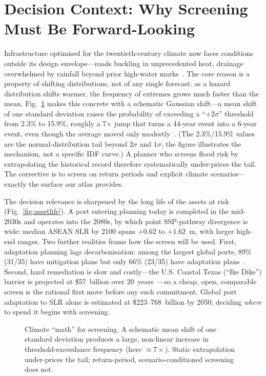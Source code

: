 \documentclass[conference]{IEEEtran}
\begin{document}
\section{Decision Context: Why Screening Must Be Forward-Looking}
Infrastructure optimised for the twentieth-century climate now faces conditions outside its design envelope---roads buckling in unprecedented heat, drainage overwhelmed by rainfall beyond prior high-water marks~\cite{jpm_intuition}. The core reason is a property of shifting distributions, not of any single forecast: as a hazard distribution shifts warmer, the frequency of extremes grows much faster than the mean. Fig.~\ref{fig:distshift} makes this concrete with a schematic Gaussian shift---a mean shift of one standard deviation raises the probability of exceeding a ``$+2\sigma$'' threshold from 2.3\% to 15.9\%, roughly a 7$\times$ jump that turns a 44-year event into a 6-year event, even though the average moved only modestly~\cite{patel2024}. (The 2.3\%/15.9\% values are the normal-distribution tail beyond $2\sigma$ and $1\sigma$; the figure illustrates the mechanism, not a specific IDF curve.) A planner who screens flood risk by extrapolating the historical record therefore systematically under-prices the tail. The corrective is to screen on return periods and explicit climate scenarios---exactly the surface our atlas provides.

The decision relevance is sharpened by the long life of the assets at risk (Fig.~\ref{fig:assetlife}). A port entering planning today is completed in the mid-2030s and operates into the 2080s, by which point SSP-pathway divergence is wide: median ASEAN SLR by 2100 spans $+0.62$ to $+1.62$~m, with larger high-end ranges. Two further realities frame how the screen will be used. First, adaptation planning lags decarbonisation: among the largest global ports, 89\% (31/35) have mitigation plans but only 66\% (23/35) have adaptation plans~\cite{jpm_seachange}. Second, hard remediation is slow and costly---the U.S. Coastal Texas (``Ike Dike'') barrier is projected at \$57~billion over 20~years~\cite{jpm_seachange}---so a cheap, open, comparable screen is the rational first move before any such commitment. Global port adaptation to SLR alone is estimated at \$223--768~billion by 2050; deciding \emph{where} to spend it begins with screening.

\begin{figure}[t]
\centering
\caption{Climate ``math'' for screening. A schematic mean shift of one standard deviation produces a large, non-linear increase in threshold-exceedance frequency (here ${\approx}7\times$). Static extrapolation under-prices the tail; return-period, scenario-conditioned screening does not.}
\label{fig:distshift}
\end{figure}
\end{document}
